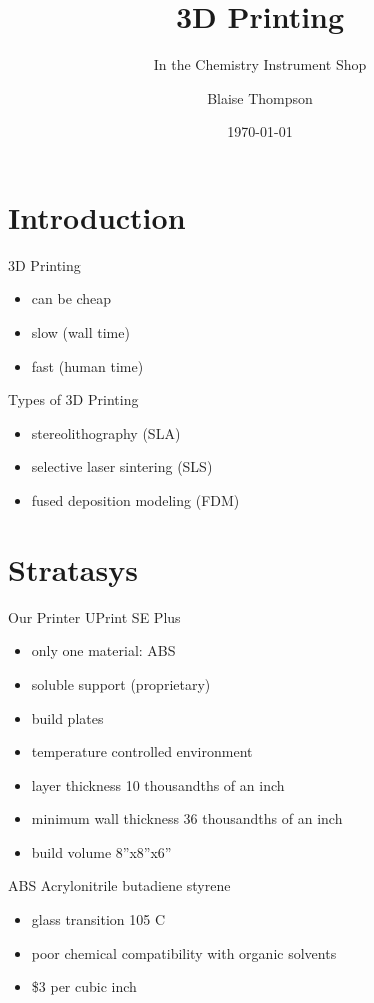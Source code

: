 \documentclass{presentation}
\title{3D Printing}
\subtitle{In the Chemistry Instrument Shop}
\author{Blaise Thompson}
\institute{University of Wisconsin--Madison}
\date{\today}
\begin{document}
\maketitle

\section{Introduction}

\begin{frame}{3D Printing}
  \begin{itemize}
    \item can be cheap
    \item slow (wall time)
    \item fast (human time)
  \end{itemize}
\end{frame}

\begin{frame}{Types of 3D Printing}
  \begin{itemize}
    \item stereolithography (SLA)
    \item selective laser sintering (SLS)
    \item fused deposition modeling (FDM)
  \end{itemize}
\end{frame}


\section{Stratasys}

\begin{frame}{Our Printer}
  UPrint SE Plus
  \begin{itemize}
    \item only one material: ABS
    \item soluble support (proprietary)
    \item build plates
    \item temperature controlled environment
    \item layer thickness 10 thousandths of an inch
    \item minimum wall thickness 36 thousandths of an inch
    \item build volume 8''x8''x6''
  \end{itemize}
\end{frame}

\begin{frame}{ABS}
  Acrylonitrile butadiene styrene
  \begin{itemize}
    \item glass transition 105 C
    \item poor chemical compatibility with organic solvents
    \item \$3 per cubic inch
  \end{itemize}
\end{frame}
\end{document}
